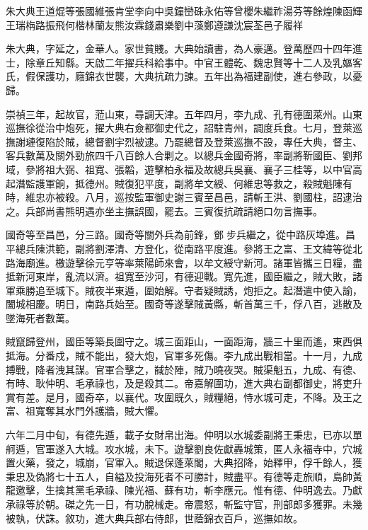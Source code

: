 
\begin{pinyinscope}
朱大典王道焜等張國維張肯堂李向中吳鐘巒硃永佑等曾櫻朱繼祚湯芬等餘煌陳函輝王瑞栴路振飛何楷林蘭友熊汝霖錢肅樂劉中藻鄭遵謙沈宸荃邑子履祥

朱大典，字延之，金華人。家世貧賤。大典始讀書，為人豪邁。登萬歷四十四年進士，除章丘知縣。天啟二年擢兵科給事中。中官王體乾、魏忠賢等十二人及乳嫗客氏，假保護功，廕錦衣世襲，大典抗疏力諫。五年出為福建副使，進右參政，以憂歸。

崇禎三年，起故官，蒞山東，尋調天津。五年四月，李九成、孔有德圍萊州。山東巡撫徐從治中炮死，擢大典右僉都御史代之，詔駐青州，調度兵食。七月，登萊巡撫謝璉復陷於賊，總督劉宇烈被逮。乃罷總督及登萊巡撫不設，專任大典，督主、客兵數萬及關外勁旅四千八百餘人合剿之。以總兵金國奇將，率副將靳國臣、劉邦域，參將祖大弼、祖寬、張韜，遊擊柏永福及故總兵吳襄、襄子三桂等，以中官高起潛監護軍餉，抵德州。賊復犯平度，副將牟文綬、何維忠等救之，殺賊魁陳有時，維忠亦被殺。八月，巡按監軍御史謝三賓至昌邑，請斬王洪、劉國柱，詔逮治之。兵部尚書熊明遇亦坐主撫誤國，罷去。三賓復抗疏請絕口勿言撫事。

國奇等至昌邑，分三路。國奇等關外兵為前鋒，鄧步兵繼之，從中路灰埠進。昌平總兵陳洪範，副將劉澤清、方登化，從南路平度進。參將王之富、王文緯等從北路海廟進。檄遊擊徐元亨等率萊陽師來會，以牟文綬守新河。諸軍皆攜三日糧，盡抵新河東岸，亂流以濟。祖寬至沙河，有德迎戰。寬先進，國臣繼之，賊大敗，諸軍乘勝追至城下。賊夜半東遁，圍始解。守者疑賊誘，炮拒之。起潛遣中使入諭，闔城相慶。明日，南路兵始至。國奇等遂擊賊黃縣，斬首萬三千，俘八百，逃散及墜海死者數萬。

賊竄歸登州，國臣等築長圍守之。城三面距山，一面距海，牆三十里而遙，東西俱抵海。分番戍，賊不能出，發大炮，官軍多死傷。李九成出戰相當。十一月，九成搏戰，降者洩其謀。官軍合擊之，馘於陣，賊乃曉夜哭。賊渠魁五，九成、有德、有時、耿仲明、毛承祿也，及是殺其二。帝嘉解圍功，進大典右副都御史，將吏升賞有差。是月，國奇卒，以襄代。攻圍既久，賊糧絕，恃水城可走，不降。及王之富、祖寬奪其水門外護牆，賊大懼。

六年二月中旬，有德先遁，載子女財帛出海。仲明以水城委副將王秉忠，已亦以單舸遁，官軍遂入大城。攻水城，未下。遊擊劉良佐獻轟城策，匿人永福寺中，穴城置火藥，發之，城崩，官軍入。賊退保蓬萊閣，大典招降，始釋甲，俘千餘人，獲秉忠及偽將七十五人，自縊及投海死者不可勝計，賊盡平。有德等走旅順，島帥黃龍邀擊，生擒其黨毛承祿、陳光福、蘇有功，斬李應元。惟有德、仲明逸去。乃獻承祿等於朝。磔之先一日，有功脫械走。帝震怒，斬監守官，刑部郎多獲罪。未幾被執，伏誅。敘功，進大典兵部右侍郎，世蔭錦衣百戶，巡撫如故。


\end{pinyinscope}
